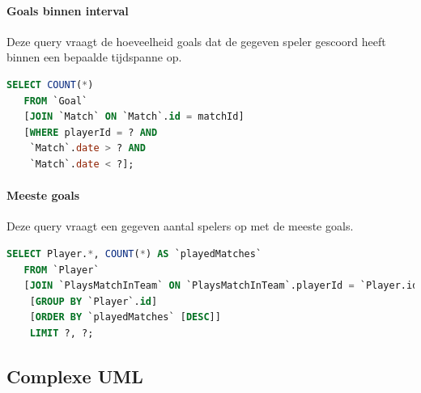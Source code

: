 \documentclass[11pt]{article}
\begin{document}
\paragraph{Goals binnen interval}

  Deze query vraagt de hoeveelheid goals dat de gegeven speler gescoord heeft binnen een bepaalde tijdspanne op.

  \begin{framed}
  \begin{lstlisting}[language=sql]
  SELECT COUNT(*)
   FROM `Goal`
   [JOIN `Match` ON `Match`.id = matchId]
   [WHERE playerId = ? AND
    `Match`.date > ? AND
    `Match`.date < ?];

  \end{lstlisting}
  \end{framed}


\paragraph{Meeste goals}

  Deze query vraagt een gegeven aantal spelers op met de meeste goals.

  \begin{framed}
  \begin{lstlisting}[language=sql]
  SELECT Player.*, COUNT(*) AS `playedMatches`
   FROM `Player`
   [JOIN `PlaysMatchInTeam` ON `PlaysMatchInTeam`.playerId = `Player.id`]
    [GROUP BY `Player`.id] 
    [ORDER BY `playedMatches` [DESC]]   
    LIMIT ?, ?;

  \end{lstlisting}
  \end{framed}





\subsection{Complexe UML}
\end{document}

